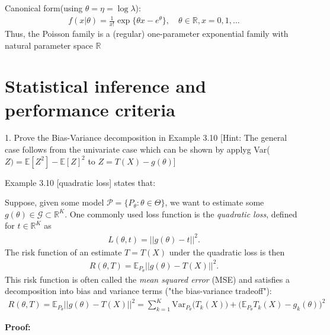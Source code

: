 \documentclass[10pt]{article}
\begin{document}
Canonical form(using $\theta = \eta = \log \lambda $):
\begin{gather*}
    f(x | \theta) = \frac{1}{x!}\exp\{\theta x - e^\theta\},\quad\theta\in \mathbb{R}, x = 0, 1, …
\end{gather*}
Thus, the Poisson family is a (regular) one-parameter exponential family with natural parameter space $\mathbb{R}$

\newpage

\section{Statistical inference and performance criteria}

\hfill

1. Prove the Bias-Variance decomposition in Example 3.10 [Hint: The general case follows from the univariate case which can be shown by applyg Var($Z) = \mathbb{E}[Z^2] - \mathbb{E}[Z]^2 $ to $Z = T(X) - g(\theta)$]

Example 3.10 [quadratic loss] states that: 

Suppose, given some model $\mathcal{P} = \{P_\theta : \theta\in\Theta\}$, we want to estimate some $g(\theta)\in \mathcal{G}\subset \mathbb{R}^K $. One commonly used loss function is the \textit{quadratic loss}, defined for $t\in \mathbb{R}^K $ as 
\begin{gather*}
    L(\theta, t) = ||g(\theta) - t||^2.
\end{gather*}
The risk function of an estimate $T = T(X)$ under the quadratic loss is then 
\begin{gather*}
    R(\theta, T) = \mathbb{E}_{P_\theta}||g(\theta) - T(X)||^2.
\end{gather*}
This risk function is often called the \textit{mean squared error} (MSE) and satisfies a decomposition into bias and variance terms ("the bias-variance tradeoff"):
\begin{gather*}
    R(\theta, T) = \mathbb{E}_{P_\theta}||g(\theta) - T(X)||^2 = \sum_{k = 1}^{K}\text{Var}_{P_\theta}\big(T_k(X)\big) + \big(\mathbb{E}_{P_\theta}T_k(X) - g_k(\theta)\big)^2
\end{gather*}

\textbf{Proof:}
\end{document}

